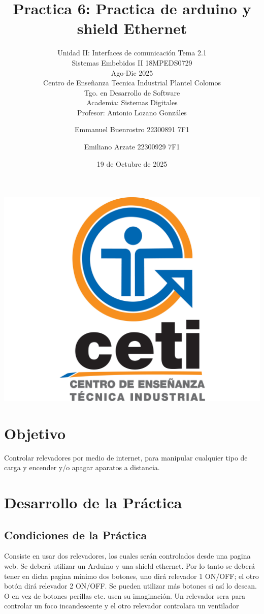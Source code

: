 \documentclass[11pt]{scrartcl}
\title {Practica 6: Practica de arduino y shield Ethernet}
\subtitle{Unidad II: Interfaces de comunicación Tema 2.1 \\ Sistemas Embebidos II 18MPEDS0729 \\ Ago-Dic 2025 \\ Centro de Enseñanza Tecnica Industrial Plantel Colomos\\Tgo. en Desarrollo de Software \\ Academia: Sistemas Digitales \\Profesor: Antonio Lozano Gonzáles }
\date{19 de Octubre de 2025}
\author{Emmanuel Buenrostro 22300891 7F1 \\ \and Emiliano Arzate 22300929 7F1 \\}
\begin{document}
\maketitle
\begin{center}
   \includegraphics[scale=0.15]{../../cetilogo.jpg} 
\end{center}
\newpage

\section{Objetivo}
Controlar relevadores por medio de internet, para manipular cualquier  tipo de carga y encender y/o apagar aparatos a distancia.
\section{Desarrollo de la Práctica}

\subsection{Condiciones de la Práctica}
Consiste en usar dos relevadores, los cuales serán controlados desde una pagina web. Se deberá utilizar un Arduino y
una shield ethernet. Por lo tanto se deberá tener  en dicha pagina mínimo dos botones, uno dirá relevador 1 ON/OFF; el otro botón dirá relevador 2 ON/OFF. Se pueden utilizar más botones si así lo desean. O en vez de botones perillas etc. usen su imaginación.
Un relevador sera para controlar un foco incandescente y el otro relevador controlara un ventilador
\end{document}
